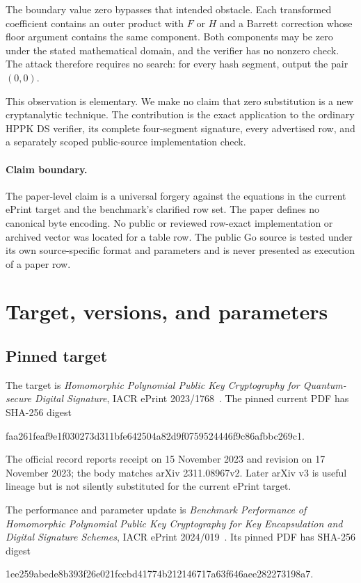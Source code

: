 \documentclass[10pt,a4paper]{article}
\begin{document}
The boundary value zero bypasses that intended obstacle. Each transformed
coefficient contains an outer product with $F$ or $H$ and a Barrett correction
whose floor argument contains the same component. Both components may be zero
under the stated mathematical domain, and the verifier has no nonzero check.
The attack therefore requires no search: for every hash segment, output the
pair $(0,0)$.

This observation is elementary. We make no claim that zero substitution is a
new cryptanalytic technique. The contribution is the exact application to the
ordinary HPPK DS verifier, its complete four-segment signature, every
advertised row, and a separately scoped public-source implementation check.

\paragraph{Claim boundary.}
The paper-level claim is a universal forgery against the equations in the
current ePrint target and the benchmark's clarified row set. The paper defines
no canonical byte encoding. No public or reviewed row-exact implementation or
archived vector was located for a table row. The public Go source is tested
under its own source-specific format and parameters and is never presented as
execution of a paper row.

\section{Target, versions, and parameters}

\subsection{Pinned target}

The target is \emph{Homomorphic Polynomial Public Key Cryptography for
Quantum-secure Digital Signature}, IACR ePrint 2023/1768~\cite{target}. The
pinned current PDF has SHA-256 digest
\begin{center}
\small\ttfamily
faa261feaf9e1f030273d311bfe642504a82d9f0759524446f9c86afbbc269c1.
\end{center}
The official record reports receipt on 15 November 2023 and revision on
17 November 2023; the body matches arXiv 2311.08967v2. Later arXiv v3 is useful
lineage but is not silently substituted for the current ePrint target.

The performance and parameter update is \emph{Benchmark Performance of
Homomorphic Polynomial Public Key Cryptography for Key Encapsulation and
Digital Signature Schemes}, IACR ePrint 2024/019~\cite{benchmark}. Its pinned
PDF has SHA-256 digest
\begin{center}
\small\ttfamily
1ee259abede8b393f26e021fccbd41774b212146717a63f646aee282273198a7.
\end{center}
\end{document}

